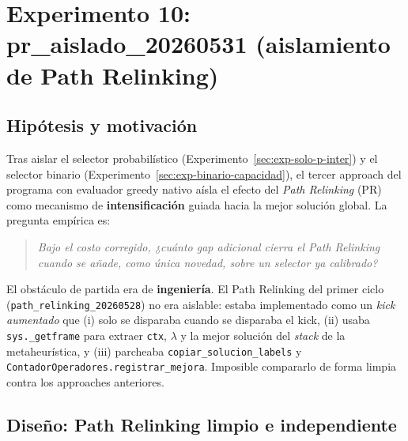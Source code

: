 \providecommand{\TODO}[1]{\textcolor{rojomalo}{\textbf{[TODO: #1]}}}

\section{Experimento 10: pr\_aislado\_20260531 (aislamiento de Path Relinking)}
\label{sec:exp-pr-aislado}

\subsection{Hipótesis y motivación}

Tras aislar el selector probabilístico (Experimento~\ref{sec:exp-solo-p-inter})
y el selector binario (Experimento~\ref{sec:exp-binario-capacidad}), el tercer
approach del programa con evaluador greedy nativo aísla el efecto del
\emph{Path Relinking} (PR) como mecanismo de \textbf{intensificación} guiada
hacia la mejor solución global. La pregunta empírica es:

\begin{quote}
\textit{Bajo el costo corregido, ¿cuánto gap adicional cierra el Path
Relinking cuando se añade, como única novedad, sobre un selector ya
calibrado?}
\end{quote}

El obstáculo de partida era de \textbf{ingeniería}. El Path Relinking del
primer ciclo (\texttt{path\_relinking\_20260528}) no era aislable: estaba
implementado como un \emph{kick aumentado} que (i) solo se disparaba cuando se
disparaba el kick, (ii) usaba \texttt{sys.\_getframe} para extraer
\texttt{ctx}, $\lambda$ y la mejor solución del \emph{stack} de la
metaheurística, y (iii) parcheaba \texttt{copiar\_solucion\_labels} y
\texttt{ContadorOperadores.registrar\_mejora}. Imposible compararlo de forma
limpia contra los approaches anteriores.

\subsection{Diseño: Path Relinking limpio e independiente}

